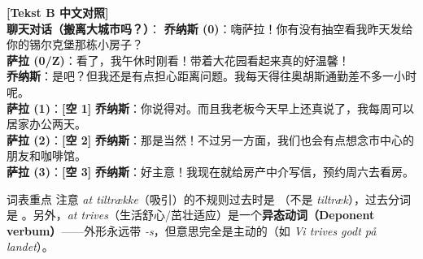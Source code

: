 \begin{transbox}
\small
\textbf{\color{NCDTeal}[Tekst B 中文对照]}\\
\textbf{聊天对话（搬离大城市吗？）}：
\textbf{乔纳斯 (0)}：嗨萨拉！你有没有抽空看我昨天发给你的锡尔克堡那栋小房子？\\
\textbf{萨拉 (0/Z)}：看了，我午休时刚看！带着大花园看起来真的好温馨！\\
\textbf{乔纳斯}：是吧？但我还是有点担心距离问题。我每天得往奥胡斯通勤差不多一小时呢。\\
\textbf{萨拉 (1)}：\textbf{[空 1]} \quad \textbf{乔纳斯}：你说得对。而且我老板今天早上还真说了，我每周可以居家办公两天。\\
\textbf{萨拉 (2)}：\textbf{[空 2]} \quad \textbf{乔纳斯}：那是当然！不过另一方面，我们也会有点想念市中心的朋友和咖啡馆。\\
\textbf{萨拉 (3)}：\textbf{[空 3]} \quad \textbf{乔纳斯}：好主意！我现在就给房产中介写信，预约周六去看房。
\end{transbox}


\begin{tipbox}{词表重点}
注意 \textit{at tiltrække}（吸引）的不规则过去时是 （不是 \textit{tiltræk}），过去分词是 。另外，\textit{at trives}（生活舒心/茁壮适应）是一个\textbf{异态动词（Deponent verbum）}——外形永远带 \textit{-s}，但意思完全是主动的（如 \textit{Vi trives godt på landet}）。
\end{tipbox}

